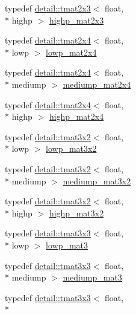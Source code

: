 \begin{DoxyCompactItemize}
\item 
typedef \hyperlink{structglm_1_1detail_1_1tmat2x3}{detail\-::tmat2x3}$<$ float, \\*
highp $>$ \hyperlink{group__core__precision_ga7d4e5a1c803be5688c75241c924dfa58}{highp\-\_\-mat2x3}
\item 
typedef \hyperlink{structglm_1_1detail_1_1tmat2x4}{detail\-::tmat2x4}$<$ float, \\*
lowp $>$ \hyperlink{group__core__precision_gaa62e33ee2864909c8522a549fbf40ce5}{lowp\-\_\-mat2x4}
\item 
typedef \hyperlink{structglm_1_1detail_1_1tmat2x4}{detail\-::tmat2x4}$<$ float, \\*
mediump $>$ \hyperlink{group__core__precision_gae90cf4be1ded03a3a5b7b42045da253c}{mediump\-\_\-mat2x4}
\item 
typedef \hyperlink{structglm_1_1detail_1_1tmat2x4}{detail\-::tmat2x4}$<$ float, \\*
highp $>$ \hyperlink{group__core__precision_ga3cc506666b7a95db56f9d2eb787b6e20}{highp\-\_\-mat2x4}
\item 
typedef \hyperlink{structglm_1_1detail_1_1tmat3x2}{detail\-::tmat3x2}$<$ float, \\*
lowp $>$ \hyperlink{group__core__precision_ga17219f89f804dbf4620d4caacf32cfe2}{lowp\-\_\-mat3x2}
\item 
typedef \hyperlink{structglm_1_1detail_1_1tmat3x2}{detail\-::tmat3x2}$<$ float, \\*
mediump $>$ \hyperlink{group__core__precision_ga1215b70c2750b6e9ab813ced8dcae568}{mediump\-\_\-mat3x2}
\item 
typedef \hyperlink{structglm_1_1detail_1_1tmat3x2}{detail\-::tmat3x2}$<$ float, \\*
highp $>$ \hyperlink{group__core__precision_gabc7767293ff69cd56717ee9d8be62963}{highp\-\_\-mat3x2}
\item 
typedef \hyperlink{structglm_1_1detail_1_1tmat3x3}{detail\-::tmat3x3}$<$ float, \\*
lowp $>$ \hyperlink{group__core__precision_gaae2935658c6a3668ac1935a7f6064d51}{lowp\-\_\-mat3}
\item 
typedef \hyperlink{structglm_1_1detail_1_1tmat3x3}{detail\-::tmat3x3}$<$ float, \\*
mediump $>$ \hyperlink{group__core__precision_gacf45e22f1fb2703b181995676963a1f9}{mediump\-\_\-mat3}
\item 
typedef \hyperlink{structglm_1_1detail_1_1tmat3x3}{detail\-::tmat3x3}$<$ float, \\*

\end{DoxyCompactItemize}
